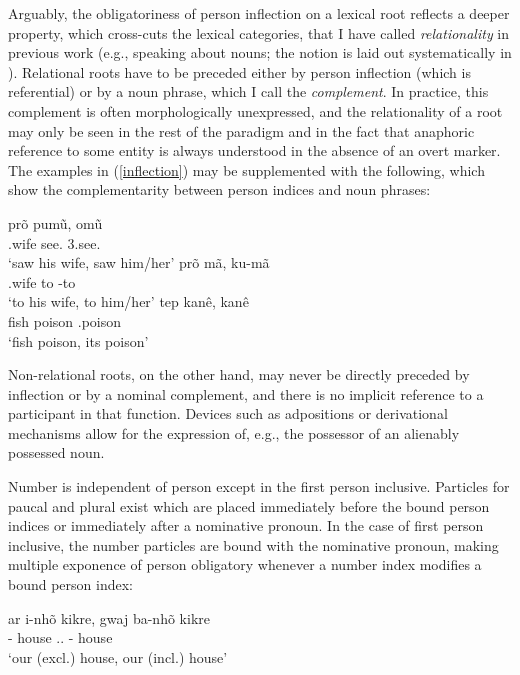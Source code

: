\documentclass[output=paper]{langscibook}
\begin{document}
Arguably, the obligatoriness of person inflection on a lexical root reflects a deeper property, which cross-cuts the lexical categories, that I have called {\em relationality} in previous work (e.g., \citealt{salanova:phd} speaking about nouns; the notion is laid out systematically in \citealt{relationality-1}).\label{relationality} Relational roots have to be preceded either by person inflection (which is referential) or by a noun phrase, which I call the {\em complement}. In practice, this complement is often morphologically unexpressed, and the relationality of a root may only be seen in the rest of the paradigm and in the fact that anaphoric reference to some entity is always understood in the absence of an overt marker. The examples in (\ref{inflection}) may be supplemented with the following, which show the complementarity between person indices and noun phrases:

\ea
    \ea\gll prõ pumũ, omũ\\
        \Third.wife see.\Fin{} 3.see.\Fin{}\\
      \glt `saw his wife, saw him/her'
    \ex\gll prõ mã, ku-mã\\
        \Third.wife to \Third\Acc-to\\
      \glt `to his wife, to him/her'
    \ex\gll tep kanê, kanê\\
        fish poison \Third.poison\\
      \glt `fish poison, its poison'
    \z
\z

Non-relational roots, on the other hand, may never be directly preceded by inflection or by a nominal complement, and there is no implicit reference to a participant in that function. Devices such as adpositions or derivational mechanisms allow for the expression of, e.g., the possessor of an alienably possessed noun.

Number is independent of person except in the first person inclusive. Particles for paucal and plural exist which are placed immediately before the bound person indices or immediately after a nominative pronoun. In the case of first person inclusive, the number particles are bound with the nominative pronoun, making multiple exponence of person obligatory whenever a number index modifies a bound person index:

\ea\gll ar i-nhõ kikre, gwaj ba-nhõ kikre\\
      \Pauc{} \First-\Poss{} house \First\Incl{}.\Nom{}.\Pauc{} \First\Incl{}-\Poss{} house\\
    \glt `our (excl.) house, our (incl.) house'
\z
\end{document}
